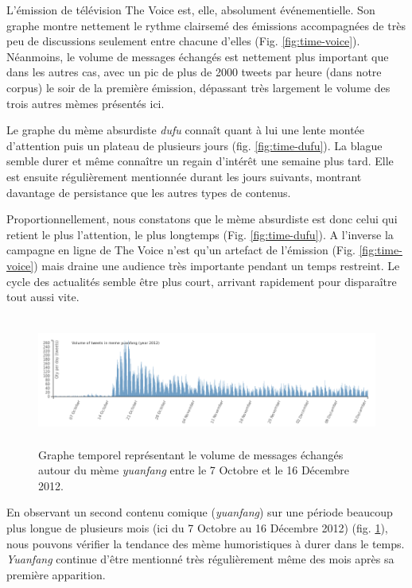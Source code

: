 L{\textquoteright}émission de télévision The Voice est, elle, absolument événementielle. Son graphe montre nettement le rythme clairsemé des émissions accompagnées de très peu de discussions seulement entre chacune d'elles (Fig. \ref{fig:time-voice}). Néanmoins, le volume de messages échangés est nettement plus important que dans les autres cas, avec un pic de plus de 2000 tweets par heure (dans notre corpus) le soir de la première émission, dépassant très largement le volume des trois autres mèmes présentés ici.

Le graphe du mème absurdiste \textit{dufu} connaît quant à lui une lente montée d{\textquoteright}attention puis un plateau de plusieurs jours (fig. \ref{fig:time-dufu}). La blague semble durer et même conna\^itre un regain d{\textquoteright}intérêt une semaine plus tard. Elle est ensuite régulièrement mentionnée durant les jours suivants, montrant davantage de persistance que les autres types de contenus.

Proportionnellement, nous constatons que le mème absurdiste est donc celui qui retient le plus l{\textquoteright}attention, le plus longtemps (Fig. \ref{fig:time-dufu}). A l{\textquoteright}inverse la campagne en ligne de The Voice n{\textquoteright}est qu{\textquoteright}un artefact de l{\textquoteright}émission (Fig. \ref{fig:time-voice}) mais draine une audience très importante pendant un temps restreint. Le cycle des actualités semble être plus court, arrivant rapidement pour disparaître tout aussi vite.

\begin{figure}[h!]
    \centering
    
  \includegraphics[width=6.0087in,height=1.6697in]{figures/chap4/chapitre4-img5.png}
  \caption{
   Graphe temporel représentant le volume de messages échangés  autour du mème \textit{yuanfang} entre le 7 Octobre et le 16 Décembre 2012.
  }
  \label{fig:time-yuanfang}
\end{figure}

En observant un second contenu comique (\textit{yuanfang}) sur une période beaucoup plus longue de plusieurs mois (ici du 7 Octobre au 16 Décembre 2012) (fig. \ref{fig:time-yuanfang}), nous pouvons vérifier la tendance des mème humoristiques \`a durer dans le temps. \textit{Yuanfang} continue d{\textquoteright}être mentionné très régulièrement même des mois après sa première apparition. 

